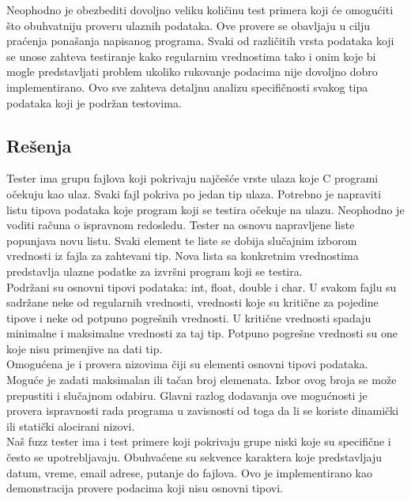 \documentclass[a4paper]{article}
\begin{document}
{Neophodno je obezbediti dovoljno veliku količinu test primera koji će omogućiti što obuhvatniju proveru ulaznih podataka. Ove provere se obavljaju u cilju praćenja ponašanja napisanog programa. Svaki od različitih vrsta podataka koji se unose zahteva testiranje kako regularnim vrednostima tako i onim koje bi mogle predstavljati problem ukoliko rukovanje podacima nije dovoljno dobro implementirano. Ovo sve zahteva detaljnu analizu specifičnosti svakog tipa podataka koji je podržan testovima.

\subsection{Rešenja}
\label{subsec:resenja_koje_nudi_tester}

Tester ima grupu fajlova koji pokrivaju najčešće vrste ulaza koje C programi očekuju kao ulaz. Svaki fajl pokriva po jedan tip ulaza. Potrebno je napraviti listu tipova podataka koje program koji se testira očekuje na ulazu. Neophodno je voditi računa o ispravnom redosledu. Tester na osnovu napravljene liste popunjava novu listu. Svaki element te liste se dobija slučajnim izborom vrednosti iz fajla za zahtevani tip. Nova lista sa konkretnim vrednostima predstavlja ulazne podatke za izvršni program koji se testira. \\

Podržani su osnovni tipovi podataka: int, float, double i char. U svakom fajlu su sadržane neke od regularnih vrednosti, vrednosti koje su kritične za pojedine tipove i neke od potpuno pogrešnih vrednosti. U kritične vrednosti spadaju minimalne i maksimalne vrednosti za taj tip. Potpuno pogrešne vrednosti su one koje nisu primenjive na dati tip. \\

Omogućena je i provera nizovima čiji su elementi osnovni tipovi podataka. Moguće je zadati maksimalan ili tačan broj elemenata. Izbor ovog broja se može prepustiti i slučajnom odabiru. Glavni razlog dodavanja ove mogućnosti je provera ispravnosti rada programa u zavisnosti od toga da li se koriste dinamički ili statički alocirani nizovi. \\

Naš fuzz tester ima i test primere koji pokrivaju grupe niski koje su specifične i često se upotrebljavaju. Obuhvaćene su sekvence karaktera koje predstavljaju datum, vreme, email adrese, putanje do fajlova. Ovo je implementirano kao demonstracija provere podacima koji nisu osnovni tipovi. \\
 
}
\end{document}
